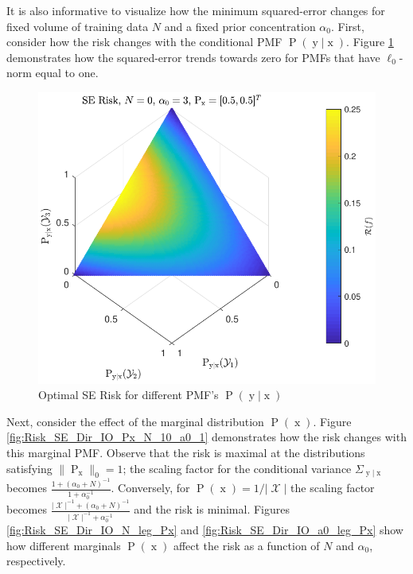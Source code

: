 \documentclass[12pt]{report}
\DeclareMathOperator{\xrm}{\mathrm{x}}
\DeclareMathOperator{\yrm}{\mathrm{y}}
\DeclareMathOperator{\Prm}{\mathrm{P}}
\DeclareMathOperator{\Xcal}{\mathcal{X}}
\begin{document}
It is also informative to visualize how the minimum squared-error changes for fixed volume of training data $N$ and a fixed prior concentration $\alpha_0$. First, consider how the risk changes with the conditional PMF $\Prm(\yrm | \xrm)$. Figure \ref{fig:Risk_SE_Dir_IO_Pyx} demonstrates how the squared-error trends towards zero for PMFs that have $\ell_0$-norm equal to one.
\begin{figure}
\centering
\includegraphics[width=0.8\linewidth]{Risk_SE_Dir_IO_Pyx.pdf}
\caption{Optimal SE Risk for different PMF's $\Prm(\yrm | \xrm)$}
\label{fig:Risk_SE_Dir_IO_Pyx}
\end{figure}
Next, consider the effect of the marginal distribution $\Prm(\xrm)$. Figure \ref{fig:Risk_SE_Dir_IO_Px_N_10_a0_1} demonstrates how the risk changes with this marginal PMF. Observe that the risk is maximal at the distributions satisfying $\| \Prm_{\xrm} \|_0 = 1$; the scaling factor for the conditional variance $\Sigma_{\yrm | \xrm}$ becomes $\frac{1 + (\alpha_0+N)^{-1}}{1 + \alpha_0^{-1}}$. Conversely, for $\Prm(\xrm) = 1/|\Xcal|$ the scaling factor becomes $\frac{|\Xcal|^{-1} + (\alpha_0+N)^{-1}}{|\Xcal|^{-1} + \alpha_0^{-1}}$ and the risk is minimal. Figures \ref{fig:Risk_SE_Dir_IO_N_leg_Px} and \ref{fig:Risk_SE_Dir_IO_a0_leg_Px} show how different marginals $\Prm(\xrm)$ affect the risk as a function of $N$ and $\alpha_0$, respectively.
\end{document}
